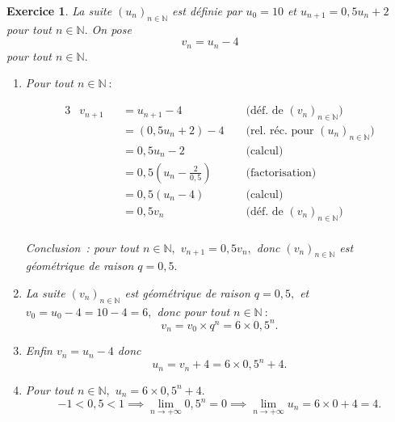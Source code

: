 \documentclass[10pt]{article}
\newtheorem{exo}{Exercice}
\begin{document}
\begin{exo}

La suite $(u_n)_{n\in\mathbb{N}}$ est définie par $u_0=10$ et $u_{n+1}=0,5u_n+2$ pour tout $n\in\mathbb{N}.$ On pose \[v_n=u_n-4\] pour tout $n\in\mathbb{N}.$

\begin{enumerate}
\item Pour tout $n\in\mathbb{N}~:$



\begin{alignat*}{3}
&v_{n+1}&& =u_{n+1}-4 && \text{  (déf. de } (v_n)_{n\in\mathbb{N}})\\
& && =(0,5u_n+2)-4 && \text{  (rel. réc. pour } (u_n)_{n\in\mathbb{N}})\\
& && =0,5u_n-2 && \text{  (calcul)}\\
& && =0,5\left(u_n-\frac{2}{0,5}\right) && \text{  (factorisation)}\\
& && =0,5(u_n-4) && \text{  (calcul)}\\
& && =0,5v_n&& \text{  (déf. de } (v_n)_{n\in\mathbb{N}})\\
\end{alignat*}


Conclusion~: pour tout $n\in\mathbb{N},$ $v_{n+1}=0,5v_n,$
donc $(v_n)_{n\in\mathbb{N}}$ est géométrique de raison $q=0,5.$
\item La suite $(v_n)_{n\in\mathbb{N}}$ est géométrique de raison $q=0,5,$ et  $v_0=u_0-4=10-4=6,$ donc pour tout $n\in\mathbb{N}~:$
\[v_n=v_0\times q^n=6\times 0,5^n.\]
\item Enfin $v_n=u_n-4$ donc
\[u_n=v_n+4=6\times 0,5^n+4.\]
\item Pour tout $n\in\mathbb{N},$ $u_n=6\times 0,5^n+4.$
\[-1<0,5<1\implies \lim\limits_{n\to +\infty} 0,5^n = 0\implies \lim\limits_{n\to +\infty} u_n=6\times 0+4=4.\]

\end{enumerate}
\end{exo}
\end{document}
